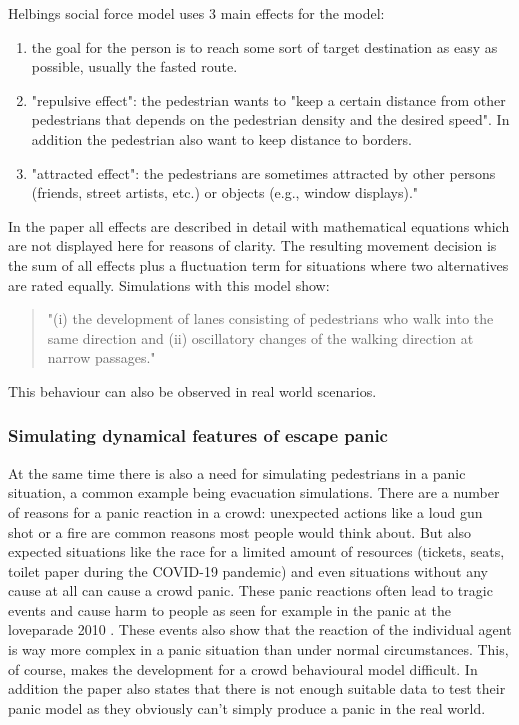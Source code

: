 \documentclass{acmsiggraph}               %
\begin{document}
Helbings social force model uses 3 main effects for the model:
\begin{enumerate}
    \item the goal for the person is to reach some sort of target destination as easy as possible, usually the fasted route.
    \item "repulsive effect": the pedestrian wants to "keep a certain distance from other pedestrians that depends on the pedestrian density and the desired speed". In addition the pedestrian also want to keep distance to borders.  
    \item "attracted effect": the pedestrians are sometimes attracted by other persons (friends, street artists, etc.) or objects (e.g., window displays)."
\end{enumerate}
In the paper all effects are described in detail with mathematical equations which are not displayed here for reasons of clarity. The resulting movement decision is the sum of all effects plus a fluctuation term for situations where two alternatives are rated equally. Simulations with this model show:
\begin{quote}
    "(i) the development of lanes consisting of pedestrians who walk into the same direction and (ii) oscillatory changes of the walking direction at narrow passages."
\end{quote}
This behaviour can also be observed in real world scenarios. 

\subsubsection{Simulating dynamical features of escape panic}\cite{helbing_simulating_2000} At the same time there is also a need for simulating pedestrians in a panic situation, a common example being evacuation simulations.
There are a number of reasons for a panic reaction in a crowd: unexpected actions like a loud gun shot or a fire are common reasons most people would think about. But also expected situations like the race for a limited amount of resources (tickets, seats, toilet paper during the COVID-19 pandemic)  and even situations without any cause at all can cause a crowd panic. These panic reactions often lead to tragic events and cause harm to people as seen for example in the panic at the loveparade 2010 \cite{dumbs_massenpanik_2010} . These events also show that the reaction of the individual agent is way more complex in a panic situation than under normal circumstances. This, of course, makes the development for a crowd behavioural model difficult. In addition the paper also states that there is not enough suitable data to test their panic model as they obviously can't simply produce a panic in the real world. 
\end{document}
